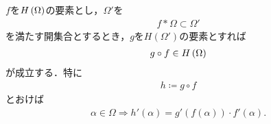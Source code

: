 	\begin{screen}
		\begin{thm}[連鎖律]
			$f$を$H\left(\Omega\right)$の要素とし，$\Omega'$を
			\begin{align}
				f \ast \Omega \subset \Omega'
			\end{align}
			を満たす開集合とするとき，$g$を$H(\Omega')$の要素とすれば
			\begin{align}
				g \circ f \in H\left(\Omega\right)
			\end{align}
			が成立する．特に
			\begin{align}
				h \coloneqq g \circ f
			\end{align}
			とおけば
			\begin{align}
				\alpha \in \Omega \Longrightarrow h'(\alpha) = g'(f(\alpha)) \cdot f'(\alpha).
			\end{align}
		\end{thm}
	\end{screen}
	

